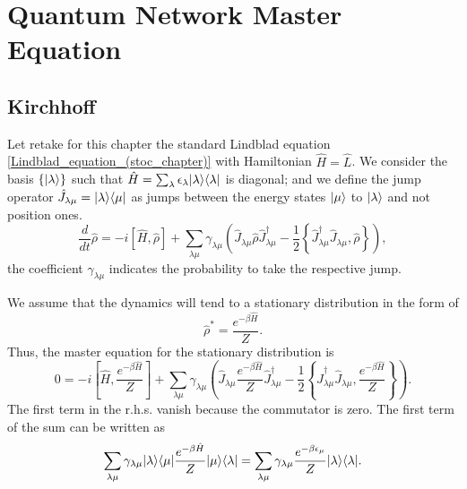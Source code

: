 \chapter{Quantum Network Master Equation}

\section{Kirchhoff}
Let retake for this chapter the standard Lindblad equation \eqref{Lindblad_equation_(stoc_chapter)} with Hamiltonian $\hat H = \hat L$.
We consider the basis $\{\lvert\lambda\rangle\}$ such that $\hat H = \sum_\lambda \epsilon_\lambda\lvert\lambda\rangle\langle\lambda\rvert$ is diagonal; and we define the jump operator $\hat J_{\lambda\mu} = \lvert\lambda\rangle\langle\mu\rvert$ as jumps between the energy states $\lvert\mu\rangle$ to $\lvert\lambda\rangle$ and not position ones. 
\begin{equation}\label{Lindblad_energy_jump}
    \frac{d}{dt}\hat\rho = -i\left[\hat H,\hat\rho\right] + \sum_{\lambda\mu} \gamma_{\lambda\mu} \left(\hat J_{\lambda\mu} \hat\rho \hat J^\dagger_{\lambda\mu} - \frac{1}{2}\left\{ \hat J^\dagger_{\lambda\mu}\hat J_{\lambda\mu}, \hat\rho\right\} \right),
\end{equation}
the coefficient $\gamma_{\lambda\mu}$ indicates the probability to take the respective jump.

We assume that the dynamics will tend to a stationary distribution in the form of
\begin{equation}\label{pretended_stationary_distribution}
    \hat \rho^* = \frac{e^{-\beta\hat H}}{Z}.
\end{equation}
Thus, the master equation for the stationary distribution is
\begin{equation}\label{cancel_master_equation}
    0 = -i\left[\hat H, \frac{e^{-\beta\hat H}}{Z}\right] + \sum_{\lambda\mu} \gamma_{\lambda\mu} \left(\hat J_{\lambda\mu}  \frac{e^{-\beta\hat H}}{Z} \hat J^\dagger_{\lambda\mu} - \frac{1}{2}\left\{ \hat J^\dagger_{\lambda\mu}\hat J_{\lambda\mu},  \frac{e^{-\beta\hat H}}{Z}\right\} \right).
\end{equation}
The first term in the r.h.s. vanish because the commutator is zero. 
The first term of the sum can be written as 
\begin{equation}
        \sum_{\lambda\mu} \gamma_{\lambda\mu} \lvert\lambda\rangle\langle\mu\rvert\frac{e^{-\beta\hat H}}{Z} \lvert\mu\rangle\langle\lambda\rvert = 
        \sum_{\lambda\mu} \gamma_{\lambda\mu} \frac{e^{-\beta \epsilon_\mu}}{Z} \lvert\lambda\rangle\langle\lambda\rvert.
\end{equation}

